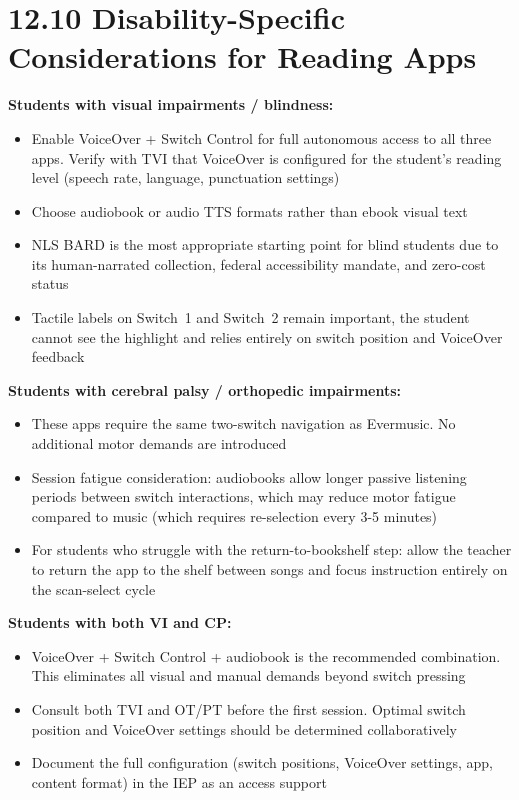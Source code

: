 \documentclass[justified,openright]{tufte-book}
\begin{document}
\section{12.10 Disability-Specific Considerations for Reading
Apps}\label{reading-app-disability-considerations}


\textbf{Students with visual impairments / blindness:}
\begin{itemize}

\item
  Enable VoiceOver + Switch Control for full autonomous access to all
  three apps. Verify with TVI that VoiceOver is configured for the
  student's reading level (speech rate, language, punctuation settings)
\item
  Choose audiobook or audio TTS formats rather than ebook visual text
\item
  NLS BARD is the most appropriate starting point for blind students
  due to its human-narrated collection, federal accessibility mandate,
  and zero-cost status
\item
  Tactile labels on Switch~1 and Switch~2 remain important, the
  student cannot see the highlight and relies entirely on switch
  position and VoiceOver feedback
\end{itemize}

\textbf{Students with cerebral palsy / orthopedic impairments:}
\begin{itemize}

\item
  These apps require the same two-switch navigation as Evermusic. No
  additional motor demands are introduced
\item
  Session fatigue consideration: audiobooks allow longer passive
  listening periods between switch interactions, which may reduce
  motor fatigue compared to music (which requires re-selection every
  3-5 minutes)
\item
  For students who struggle with the return-to-bookshelf step: allow
  the teacher to return the app to the shelf between songs and focus
  instruction entirely on the scan-select cycle
\end{itemize}

\textbf{Students with both VI and CP:}
\begin{itemize}

\item
  VoiceOver + Switch Control + audiobook is the recommended
  combination. This eliminates all visual and manual demands beyond
  switch pressing
\item
  Consult both TVI and OT/PT before the first session. Optimal switch
  position and VoiceOver settings should be determined collaboratively
\item
  Document the full configuration (switch positions, VoiceOver
  settings, app, content format) in the IEP as an access support
\end{itemize}
\end{document}
